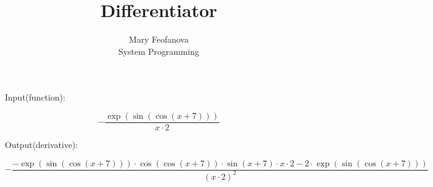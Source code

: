 \documentclass[12pt]{article}
\begin{document}
\title{Differentiator}
\author{Mary Feofanova\\
System Programming}
 
\maketitle
\begin{center}
Input(function):
\end{center}
$$-\frac{\exp(\sin(\cos(x+7)))}{x \cdot 2}$$
\begin{center}
Output(derivative):
\end{center}
$$-\frac{-\exp(\sin(\cos(x+7))) \cdot \cos(\cos(x+7)) \cdot \sin(x+7) \cdot x \cdot 2-2 \cdot \exp(\sin(\cos(x+7)))}{(x \cdot 2)^2 }$$
\end{document}
